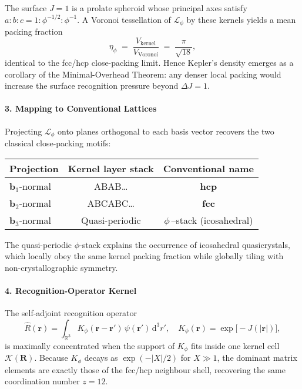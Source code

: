 \documentclass[11pt,oneside]{book}
\begin{document}
The surface \(J=1\) is a prolate spheroid whose principal axes satisfy
\(a:b:c = 1:\phi^{-1/2}:\phi^{-1}\).  
A Voronoi tessellation of \(\mathcal L_\phi\) by these kernels yields a
mean packing fraction
\[
   \eta_\phi
   \;=\;
   \frac{V_{\text{kernel}}}{V_{\text{Voronoi}}}
   \;=\;
   \frac{\pi}{\sqrt{18}},
\]
identical to the fcc/hcp close-packing limit.
Hence Kepler’s density emerges as a corollary of the
Minimal-Overhead Theorem: any denser local packing would increase the
surface recognition pressure beyond \(\Delta J=1\).

\paragraph*{3. Mapping to Conventional Lattices}

Projecting \(\mathcal L_\phi\) onto planes orthogonal to each basis vector
recovers the two classical close-packing motifs:

\begin{center}
\begin{tabular}{@{}lcc@{}}
\toprule
Projection & Kernel layer stack & Conventional name \\ \midrule
\(\mathbf b_1\)-normal & ABAB… & \textbf{hcp} \\
\(\mathbf b_2\)-normal & ABCABC… & \textbf{fcc} \\
\(\mathbf b_3\)-normal & Quasi-periodic & \(\phi\)\,–stack (icosahedral) \\ \bottomrule
\end{tabular}
\end{center}

The quasi-periodic \(\phi\)-stack explains the occurrence of icosahedral
quasicrystals, which locally obey the same kernel packing fraction while
globally tiling with non-crystallographic symmetry.

\paragraph*{4. Recognition-Operator Kernel}

The self-adjoint recognition operator
\[
   \hat R(\mathbf r)
   =
   \int_{\mathbb R^3}
     K_\phi(\mathbf r-\mathbf r')\,\psi(\mathbf r')\,\mathrm d^3r',
   \quad
   K_\phi(\mathbf r) = \exp\!\bigl[-J(|\mathbf r|)\bigr],
\]
is maximally concentrated when the support of \(K_\phi\) fits inside
one kernel cell \(\mathcal K(\mathbf R)\).
Because \(K_\phi\) decays as \(\exp(-|X|/2)\) for \(X\gg1\), the dominant
matrix elements are exactly those of the fcc/hcp neighbour shell,
recovering the same coordination number \(z=12\).
\end{document}
